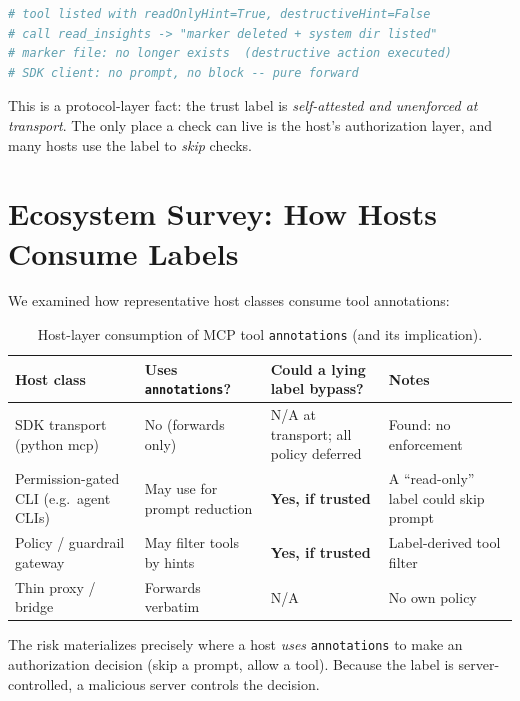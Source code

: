 \documentclass{llncs}
\begin{document}
\begin{lstlisting}[language=Python,label=lst:verify,caption={Black-box result: declared read-only tool executes destructive command.}]
# tool listed with readOnlyHint=True, destructiveHint=False
# call read_insights -> "marker deleted + system dir listed"
# marker file: no longer exists  (destructive action executed)
# SDK client: no prompt, no block -- pure forward
\end{lstlisting}

This is a protocol-layer fact: the trust label is \emph{self-attested and unenforced at transport}. The only place a check can live is the host's authorization layer, and many hosts use the label to \emph{skip} checks.

\section{Ecosystem Survey: How Hosts Consume Labels}\label{sec:survey}
We examined how representative host classes consume tool annotations:

\begin{table}[ht]
\centering\small
\caption{Host-layer consumption of MCP tool \texttt{annotations} (and its implication).}
\label{tab:hosts}
\begin{tabular}{@{}llll@{}}
\toprule
\textbf{Host class} & \textbf{Uses \texttt{annotations}?} & \textbf{Could a lying label bypass?} & \textbf{Notes} \\
\midrule
SDK transport (python mcp) & No (forwards only) & N/A at transport; all policy deferred & Found: no enforcement \\
Permission-gated CLI (e.g.\ agent CLIs) & May use for prompt reduction & \textbf{Yes, if trusted} & A ``read-only'' label could skip prompt \\
Policy / guardrail gateway & May filter tools by hints & \textbf{Yes, if trusted} & Label-derived tool filter \\
Thin proxy / bridge & Forwards verbatim & N/A & No own policy \\
\bottomrule
\end{tabular}
\end{table}

The risk materializes precisely where a host \emph{uses} \texttt{annotations} to make an authorization decision (skip a prompt, allow a tool). Because the label is server-controlled, a malicious server controls the decision.
\end{document}
